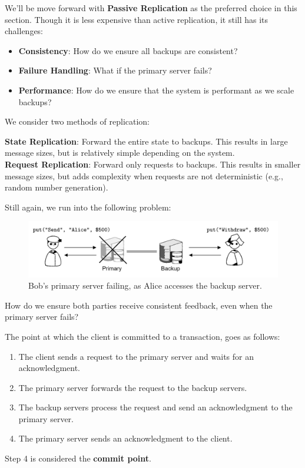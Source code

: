 \newpage 

\noindent
We'll be move forward with \textbf{Passive Replication} as the preferred choice in this section.
Though it is less expensive than active replication, it still has its challenges:
\begin{itemize}
    \item \textbf{Consistency}: How do we ensure all backups are consistent?
    \item \textbf{Failure Handling}: What if the primary server fails?
    \item \textbf{Performance}: How do we ensure that the system is performant as we scale backups?
\end{itemize}

\noindent
We consider two methods of replication:
\begin{Def}

    \textbf{State Replication}: Forward the entire state to backups. This results in large message sizes, but is relatively simple depending on the system.\\

    \noindent 
    \textbf{Request Replication}: Forward only requests to backups. This results in smaller message sizes, but adds complexity when requests are not deterministic (e.g., random number generation).
\end{Def}

\noindent
Still again, we run into the following problem:
\begin{figure}[h]
    \centering
    \includegraphics[width=.9\textwidth]{Sections/rep/primary.png}
    \caption{Bob's primary server failing, as Alice accesses the backup server.}
\end{figure}

\noindent
How do we ensure both parties receive consistent feedback, even when the primary server fails?
\begin{Def}

    \label{def:commit}
    The point at which the client is committed to a transaction, goes as follows:
    \begin{enumerate}
        \item The client sends a request to the primary server and waits for an acknowledgment.
        \item The primary server forwards the request to the backup servers.
        \item The backup servers process the request and send an acknowledgment to the primary server.
        \item The primary server sends an acknowledgment to the client.
    \end{enumerate}

    \noindent
    Step 4 is considered the \textbf{commit point}.
\end{Def}

